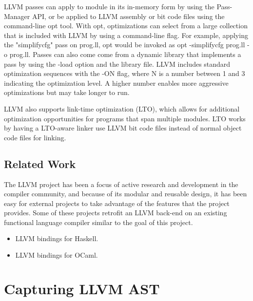 \documentclass{book}
\begin{document}
	 LLVM passes can apply to module in its in-memory form by using the Pass-Manager API, or be applied to LLVM assembly or bit code files using the command-line opt tool. With opt, optimizations can select from a large collection that is included with LLVM by using a command-line flag.  For example, applying the "simplifycfg" pass on prog.ll, opt would be invoked as opt -simplifycfg prog.ll -o prog.ll. Passes can also come come from a dynamic library that implements a pass by using the -load option and the library file. LLVM includes standard optimization sequences with the -ON flag, where N is a number between 1 and 3 indicating the optimization level. A higher number enables more aggressive optimizations but may take longer to run.\newline \newline
	 
	 LLVM also supports link-time optimization (LTO),  which allows for additional optimization opportunities for programs that span multiple modules. LTO works by having a LTO-aware linker use LLVM bit code files instead of normal object code files for linking.
	 
	\section{Related Work}
	The LLVM project has been a focus of active research and development in the compiler	community, and because of its modular and reusable design, it has been easy for external
	projects to take advantage of the features that the project provides. Some of these projects retrofit an LLVM back-end on an existing functional language compiler similar to the goal
	of this project.
	
	\begin{itemize}
		\item LLVM bindings for Haskell.
		\item LLVM bindings for OCaml.
	\end{itemize}

\chapter{Capturing LLVM AST }
	
\end{document}
